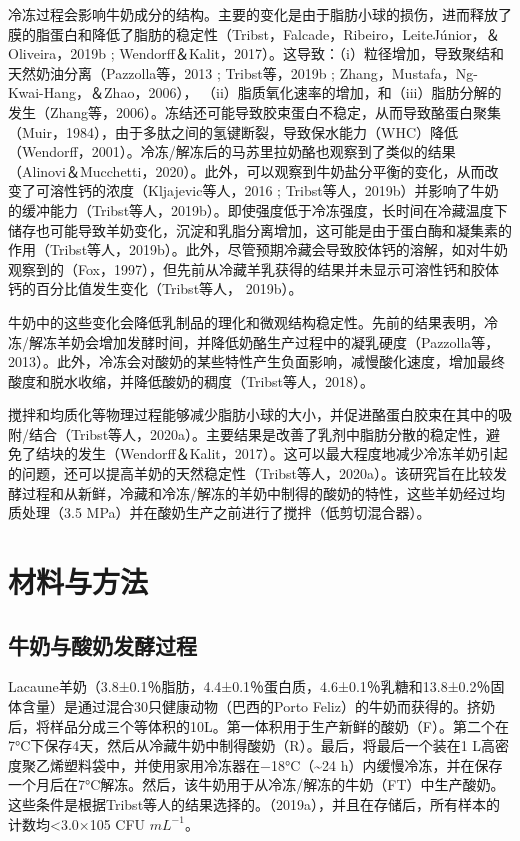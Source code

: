\documentclass[twocolumn]{ctexart}
\begin{document}
冷冻过程会影响牛奶成分的结构。主要的变化是由于脂肪小球的损伤，进而释放了膜的脂蛋白和降低了脂肪的稳定性（Tribst，Falcade，Ribeiro，LeiteJúnior，＆Oliveira，2019b ; Wendorff＆Kalit，2017）。这导致：（i）粒径增加，导致聚结和天然奶油分离（Pazzolla等，2013 ; Tribst等，2019b ; Zhang，Mustafa，Ng-Kwai-Hang，＆Zhao，2006）， （ii）脂质氧化速率的增加，和（iii）脂肪分解的发生（Zhang等，2006）。冻结还可能导致胶束蛋白不稳定，从而导致酪蛋白聚集（Muir，1984），由于多肽之间的氢键断裂，导致保水能力（WHC）降低（Wendorff，2001）。冷冻/解冻后的马苏里拉奶酪也观察到了类似的结果（Alinovi＆Mucchetti，2020）。此外，可以观察到牛奶盐分平衡的变化，从而改变了可溶性钙的浓度（Kljajevic等人，2016 ; Tribst等人，2019b）并影响了牛奶的缓冲能力（Tribst等人，2019b）。即使强度低于冷冻强度，长时间在冷藏温度下储存也可能导致羊奶变化，沉淀和乳脂分离增加，这可能是由于蛋白酶和凝集素的作用（Tribst等人，2019b）。此外，尽管预期冷藏会导致胶体钙的溶解，如对牛奶观察到的（Fox，1997），但先前从冷藏羊乳获得的结果并未显示可溶性钙和胶体钙的百分比值发生变化（Tribst等人， 2019b）。

牛奶中的这些变化会降低乳制品的理化和微观结构稳定性。先前的结果表明，冷冻/解冻羊奶会增加发酵时间，并降低奶酪生产过程中的凝乳硬度（Pazzolla等，2013）。此外，冷冻会对酸奶的某些特性产生负面影响，减慢酸化速度，增加最终酸度和脱水收缩，并降低酸奶的稠度（Tribst等人，2018）。

搅拌和均质化等物理过程能够减少脂肪小球的大小，并促进酪蛋白胶束在其中的吸附/结合（Tribst等人，2020a）。主要结果是改善了乳剂中脂肪分散的稳定性，避免了结块的发生（Wendorff＆Kalit，2017）。这可以最大程度地减少冷冻羊奶引起的问题，还可以提高羊奶的天然稳定性（Tribst等人，2020a）。该研究旨在比较发酵过程和从新鲜，冷藏和冷冻/解冻的羊奶中制得的酸奶的特性，这些羊奶经过均质处理（3.5 MPa）并在酸奶生产之前进行了搅拌（低剪切混合器）。

\section{材料与方法}
\subsection{牛奶与酸奶发酵过程}
Lacaune羊奶（3.8±0.1％脂肪，4.4±0.1％蛋白质，4.6±0.1％乳糖和13.8±0.2％固体含量）是通过混合30只健康动物（巴西的Porto Feliz）的牛奶而获得的。挤奶后，将样品分成三个等体积的10L。第一体积用于生产新鲜的酸奶（F）。第二个在7°C下保存4天，然后从冷藏牛奶中制得酸奶（R）。最后，将最后一个装在1 L高密度聚乙烯塑料袋中，并使用家用冷冻器在−18°C（\textasciitilde24 h）内缓慢冷冻，并在保存一个月后在7°C解冻。然后，该牛奶用于从冷冻/解冻的牛奶（FT）中生产酸奶。这些条件是根据Tribst等人的结果选择的。（2019a），并且在存储后，所有样本的计数均<3.0×105  CFU $mL^{-1}$。
\end{document}

